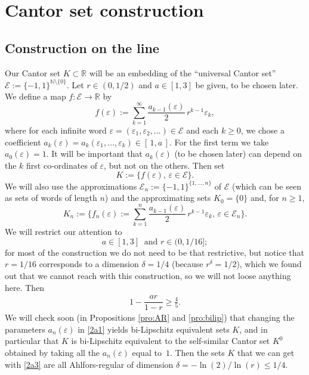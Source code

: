 \documentclass[JEP,XML,SOM,Unicode,published]{cedram}
\let\backslash\setminus
\numberwithin{equation}{section}
\theoremstyle{plain}
\theoremstyle{definition}
\newcommand{\R}{\mathbb{R}}
\newcommand{\R}{\mathbb{R}}
\newcommand{\bN}{\mathbb{N}}
\newcommand{\cE}{{\mathcal E}}
\begin{document}
\section{Cantor set construction}\label{sec:construct}

\subsection{Construction on the line}\label{sec:construct-line}

Our Cantor set $K \subset \R$ will be an embedding of the ``universal Cantor set''
$\cE :=\{-1,1\}^{\bN \backslash \{0\}}$.
Let $r \in (0, 1/2)$ and $a \in [1,3]$ be given, to be chosen later.
We define a map $f : \cE \to \R$ by
\begin{equation}\label{2a1}
f(\varepsilon):= \sum_{k=1}^\infty \dfrac{a_{k-1}(\varepsilon)}{2} \, r^{k-1} \varepsilon_k,
\end{equation}
where for each infinite word $\varepsilon= (\varepsilon_1,\varepsilon_2,\dots) \in \cE$ and each $k \geq 0$,
we chose a coefficient $a_k(\varepsilon)=a_k(\varepsilon_1,\dots,\varepsilon_{k}) \in [\,1, a\,]$.
For the first term we take $a_0(\varepsilon) = 1$.
It will be important that $a_k(\varepsilon)$ (to be chosen later) can depend on the $k$ first co-ordinates of
$\varepsilon$, but not on the others. Then set
\begin{equation}\label{eq:defK}
K:= \big \{ f(\varepsilon), \, \varepsilon\in \cE \big \}.
\end{equation}
We will also use the approximations $\cE_n:= \{-1,1\}^{\{1,\dots,n\}}$
of $\cE$ (which can be seen as sets of words of length $n$) and the approximating sets $K_0 = \{0\}$ and,
for $n \geq 1$,
\[
K_n:= \Big \{ f_n(\varepsilon):=
\sum_{k=1}^{n} \dfrac{a_{k-1}(\varepsilon)}{2} \, r^{k-1} \varepsilon_k, \, \varepsilon\in \cE_n \Big \}.
\]
We will restrict our attention to
\begin{equation}\label{2a3}
a \in [1,3] \ \text{ and } r \in (0, 1/16];
\end{equation}
for most of the construction we do not need to be that restrictive, but notice that
$r=1/16$ corresponds to a dimension $\delta = 1/4$ (because $r^\delta = 1/2$), which
we found out that we cannot reach with this construction, so we will not loose anything here.
Then
\begin{align}\label{eq:condition-a}
1- \dfrac{ar}{1-r} \geq \frac45.
\end{align}
We will check soon (in Propositions \ref{pro:AR} and \ref{pro:bilip})
that changing the parameters $a_n(\varepsilon)$ in \eqref{2a1}
yields bi-Lipschitz equivalent sets $K$, and in particular that
$K$ is bi-Lipschitz equivalent to the self-similar Cantor set $K^0$ obtained by
taking all the $a_n(\varepsilon)$ equal to~$1$. Then the sets $K$ that we can get with \eqref{2a3}
are all Ahlfors-regular of dimension $\delta = -\ln(2)/\ln(r) \leq 1/4$.
\end{document}
